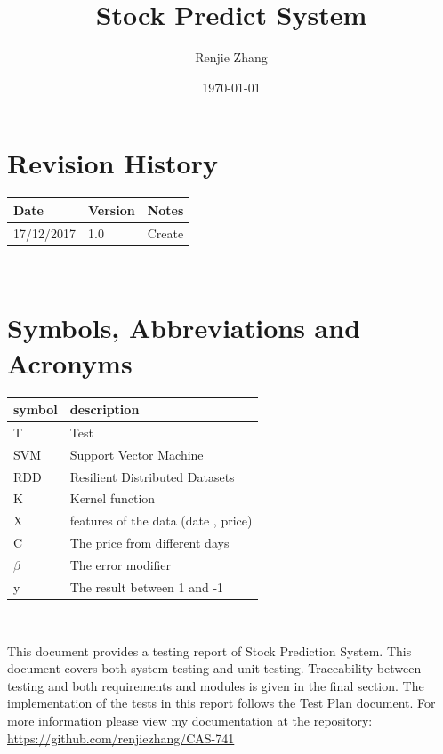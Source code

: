 \documentclass[12pt, titlepage]{article}
\begin{document}
\title{Stock Predict System} 
\author{Renjie Zhang}
\date{\today}
\maketitle


\section{Revision History}

\begin{tabularx}{\textwidth}{p{3cm}p{2cm}X}
\toprule {\bf Date} & {\bf Version} & {\bf Notes}\\
\midrule
17/12/2017 & 1.0 & Create\\

\bottomrule
\end{tabularx}

~\newpage

\section{Symbols, Abbreviations and Acronyms}

\renewcommand{\arraystretch}{1.2}
\begin{tabular}{l l} 
\toprule 
\textbf{symbol} & \textbf{description}\\
\midrule 
T & Test\\
SVM & Support Vector Machine\\
RDD &Resilient Distributed Datasets\\
K & Kernel function\\
X & features of the data (date , price)\\
C& The price from different days\\
$\beta$ & The error modifier\\
y& The result between 1 and -1\\ 
\bottomrule
\end{tabular}\\



\newpage

\tableofcontents

\listoftables %

\listoffigures %

\newpage


This document provides a testing report of Stock Prediction System. This document covers both system testing and unit testing.
Traceability between testing and both requirements and modules
is given in the final section. The implementation of the tests in this
report follows the Test Plan document. For more information please view my documentation at the repository:
\url{https://github.com/renjiezhang/CAS-741}\\
\end{document}

